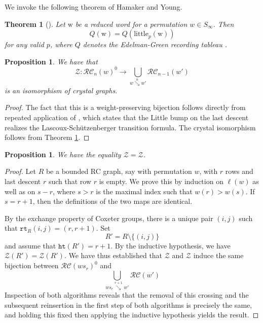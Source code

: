 \documentclass[a4paper,fleqn]{cas-sc}
\newtheorem{proposition}[lemma]{Proposition}
\newtheorem{theorem}{Theorem}[section]
\theoremstyle{definition}
\theoremstyle{remark}
\numberwithin{equation}{subsection}
\DeclareMathOperator{\sch}{\mathfrak{S}}
\newcommand{\downvar}[1]{\stackrel{#1}{\searrow}}
\newcommand{\rtt}{\mathtt{rt}}
\newcommand{\zeromap}{\mathcal{Z}}
\newcommand{\hr}{\mathtt{ht}}
\newcommand{\RC}{\mathcal{RC}}
\newcommand{\lzeromap}{\mathscr{Z}}
\newcommand{\ltb}{\mathrm{little}}
\begin{document}
We invoke the following theorem of Hamaker and Young.

\begin{theorem}[{\cite[Theorem~4.4]{hamaker2014relating}}] \label{theorem:littlecrystal}
Let $\mathrm{w}$ be a reduced word for a permutation $w\in S_\infty$. Then
$$Q(\mathrm{w}) = Q(\ltb_p(\mathrm{w}))$$
for any valid $p$, where $Q$ denotes the Edelman-Green recording tableau \cite{edelman1987balanced}.
\end{theorem}


\begin{proposition} \label{proposition:zeroequal}
  We have that
$$\lzeromap:\RC_n(w)^0\to \bigcup_{w\downvar{n} w'}\RC_{n-1}(w')$$ 
	is an isomorphism of crystal graphs.
\end{proposition}
\begin{proof}
The fact that this is a weight-preserving bijection follows directly from repeated application of \cite[Lemma~7]{little2003combinatorial}, which states that the Little bump on the last descent realizes the Lascoux-Sch\"utzenberger transition formula. The crystal isomorphism follows from Theorem \ref{theorem:littlecrystal}.
\end{proof}

\begin{proposition} \label{proposition:zerocrystal}
We have the equality $\lzeromap=\zeromap$.
\end{proposition}
\begin{proof}
Let $R$ be a bounded RC graph, say with permutation $w$, with $r$ rows and last descent $r$ such that row $r$ is empty. We prove this by induction on $\ell(w)$ as well as on $s - r$, where $s>r$ is the maximal index such that $w(r)>w(s)$. If $s=r+1$, then the definitions of the two maps are identical. 

By the exchange property of Coxeter groups, there is a unique pair $(i,j)$ such that $\rtt_R(i, j) = (r, r+1)$. Set
$$R' = R\setminus\{(i,j)\}$$
and assume that $\hr(R') = r+1$. By the inductive hypothesis, we have $\lzeromap(R') = \zeromap(R')$. We have thus established that $\lzeromap$ and $\zeromap$ induce the same bijection between $\RC(ws_r)^0$ and 
$$\bigcup_{ws_r\downvar{r+1} w'}\RC(w')$$
Inspection of both algorithms reveals that the removal of this crossing and the subsequent reinsertion in the first step of both algorithms is precisely the same, and holding this fixed then applying the inductive hypothesis yields the result.
\end{proof}
\end{document}
